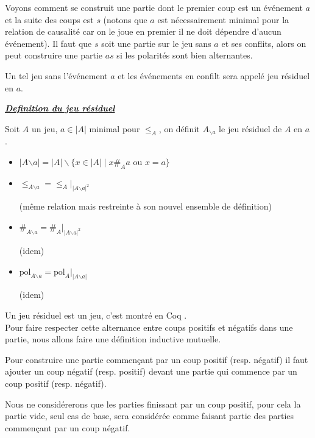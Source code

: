 \documentclass[a4paper,12pt]{article}
\renewenvironment{leftbar}{
  \def\FrameCommand{\vrule width 1pt \hspace{10pt}}
  \MakeFramed {\advance\hsize-\width \FrameRestore}
\setlength{\parskip}{10pt}}
 {\endMakeFramed}
\newenvironment{answer}[1]
{
  \vspace{0.5cm} \noindent \begin{minipage}{\linewidth}
    \textbf{\textit{\uline{#1}}}
    \begin{leftbar}
}
{
    \end{leftbar}\end{minipage}\vspace{0.2cm}
}
\begin{document}
Voyons comment se construit une partie dont le premier coup est un événement
$a$ et la suite des coups est $s$
(notons que $a$ est nécessairement minimal pour la relation de causalité car
on le joue en premier il ne doit dépendre d'aucun événement).
Il faut que $s$ soit une partie sur le jeu sans $a$ et ses conflits, alors on
peut construire une partie $as$ si les polarités sont bien alternantes.

Un tel jeu sans l'événement $a$ et les événements en confilt sera appelé
jeu résiduel en $a$.

\begin{answer}{Definition du jeu résiduel}
Soit $A$ un jeu, $a \in |A|$ minimal pour $\leq_A$, on définit
$A_{\backslash a}$ le jeu résiduel de $A$ en $a$.

\begin{itemize}
\item $|A{\backslash a}| = |A| \backslash \{x \in |A| \mid x \#_A a \text{ ou } x=a\}$
\item $\leq_{A{\backslash a}} = \leq_A|_{|A{\backslash a}|^2}$

(même relation mais restreinte à son nouvel ensemble de définition)

\item $\#_{A{\backslash a}} = \#_A|_{|A{\backslash a}|^2}$

(idem)

\item $\text{pol}_{A{\backslash a}} = \text{pol}_A|_{|A{\backslash a}|}$


(idem)


\end{itemize}

\end{answer}

Un jeu résiduel est un jeu, c'est montré en Coq \href{https://ulysse_durand.gitlab.io/stagel3/Codecoq.theories.residu.html#resES}{\faCode}.
\\

Pour faire respecter cette alternance entre coups positifs et négatifs dans
une partie, nous allons faire une définition inductive mutuelle.

Pour construire une partie commençant par un coup positif (resp. négatif)
il faut ajouter un coup négatif (resp. positif) devant une partie
qui commence par un coup positif (resp. négatif).

Nous ne considérerons que les parties finissant par un coup positif,
pour cela la partie vide, seul cas de base, sera considérée comme faisant
partie des parties commençant par un coup négatif.
\end{document}
